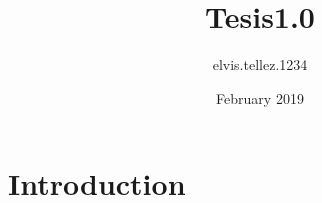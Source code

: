 \documentclass{article}
\title{Tesis1.0}
\author{elvis.tellez.1234 }
\date{February 2019}
\begin{document}
\maketitle

\section{Introduction}
\end{document}
